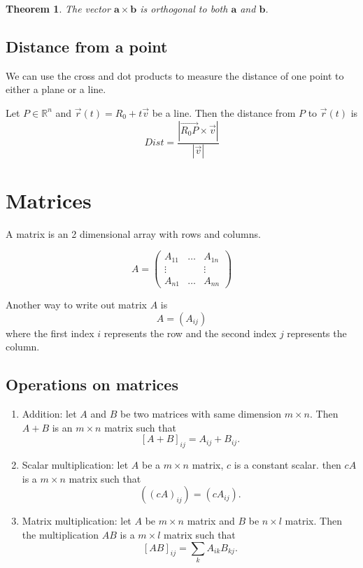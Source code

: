 \documentclass[
]{book}
\newtheorem{theorem}{Theorem}[chapter]
\theoremstyle{definition}
\theoremstyle{definition}
\theoremstyle{definition}
\theoremstyle{definition}
\theoremstyle{remark}
\begin{document}
\begin{theorem}
The vector \(\mathbf{a}\times \mathbf{b}\) is orthogonal to both \(\mathbf{a}\) and \(\mathbf{b}\).
\end{theorem}

\hypertarget{distance-from-a-point}{%
\subsection{Distance from a point}\label{distance-from-a-point}}

We can use the cross and dot products to measure the distance of one point to either a
plane or a line.

Let \(P \in \mathbb{R}^n\) and \(\vec{r}(t) = R_0 + t \vec{v}\) be a line.
Then the distance from \(P\) to \(\vec{r}(t)\) is
\[ Dist = \frac{| \vec{R_0 P} \times \vec{v}|}{| \vec{v} |}\]

\hypertarget{matrices}{%
\section{Matrices}\label{matrices}}

A matrix is an 2 dimensional array with rows and columns.

\[ A = \begin{pmatrix} A_{11} & \dots & A_{1n}\\ \vdots & & \vdots \\ A_{n1} & \dots & A_{nn}  \end{pmatrix}\]

Another way to write out matrix \(A\) is
\[ A = (A_{ij})\]
where the first index \(i\) represents the row and the second index \(j\) represents the column.

\hypertarget{operations-on-matrices}{%
\subsection{Operations on matrices}\label{operations-on-matrices}}

\begin{enumerate}
\def\labelenumi{\arabic{enumi}.}
\item
  Addition: let \(A\) and \(B\) be two matrices with same dimension \(m\times n\).
  Then \(A + B\) is an \(m\times n\) matrix such that
  \[[A + B]_{ij} = A_{ij} + B_{ij}.\]
\item
  Scalar multiplication: let \(A\) be a \(m\times n\) matrix,
  \(c\) is a constant scalar.
  then \(cA\) is a \(m\times n\) matrix such that
  \[((cA)_{ij}) = (cA_{ij}).\]
\item
  Matrix multiplication: let \(A\) be \(m\times n\) matrix and \(B\) be \(n\times l\) matrix.
  Then the multiplication \(AB\) is a \(m\times l\) matrix such that
  \[ [AB]_{ij}  =  \sum_{k} A_{ik} B_{kj} .\]
\end{enumerate}
\end{document}
